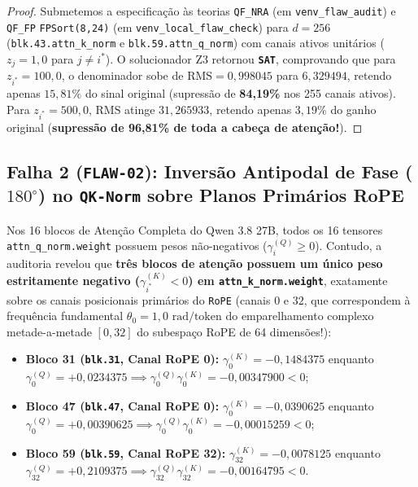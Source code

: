 \documentclass[11pt,a4paper]{article}
\theoremstyle{definition}
\begin{document}
\begin{proof}
Submetemos a especificação às teorias \texttt{QF\_NRA} (em \texttt{venv\_flaw\_audit}) e \texttt{QF\_FP} \texttt{FPSort(8,24)} (em \texttt{venv\_local\_flaw\_check}) para $d = 256$ (\texttt{blk.43.attn\_k\_norm} e \texttt{blk.59.attn\_q\_norm}) com canais ativos unitários ($z_j = 1{,}0$ para $j \neq i^*$). O solucionador Z3 retornou \textbf{\texttt{SAT}}, comprovando que para $z_{i^*} = 100{,}0$, o denominador sobe de $\text{RMS} = 0{,}998045$ para $6{,}329494$, retendo apenas $15{,}81\%$ do sinal original (supressão de \textbf{84,19\%} nos 255 canais ativos). Para $z_{i^*} = 500{,}0$, $\text{RMS}$ atinge $31{,}265933$, retendo apenas $3{,}19\%$ do ganho original (\textbf{supressão de 96,81\% de toda a cabeça de atenção!}). \qedhere
\end{proof}

\subsection{Falha 2 (\texttt{FLAW-02}): Inversão Antipodal de Fase ($180^\circ$) no \texttt{QK-Norm} sobre Planos Primários RoPE}

Nos 16 blocos de Atenção Completa do Qwen 3.8 27B, todos os 16 tensores \texttt{attn\_q\_norm.weight} possuem pesos não-negativos ($\gamma_i^{(Q)} \ge 0$). Contudo, a auditoria revelou que \textbf{três blocos de atenção possuem um único peso estritamente negativo ($\gamma_{i^*}^{(K)} < 0$) em \texttt{attn\_k\_norm.weight}}, exatamente sobre os canais posicionais primários do \texttt{RoPE} (canais $0$ e $32$, que correspondem à frequência fundamental $\theta_0 = 1{,}0\text{ rad/token}$ do emparelhamento complexo metade-a-metade $[0, 32]$ do subespaço RoPE de 64 dimensões!):
\begin{itemize}
    \item \textbf{Bloco 31 (\texttt{blk.31}, Canal RoPE 0):} $\gamma_0^{(K)} = -0{,}1484375$ enquanto $\gamma_0^{(Q)} = +0{,}0234375 \implies \gamma_0^{(Q)}\gamma_0^{(K)} = -0{,}00347900 < 0$;
    \item \textbf{Bloco 47 (\texttt{blk.47}, Canal RoPE 0):} $\gamma_0^{(K)} = -0{,}0390625$ enquanto $\gamma_0^{(Q)} = +0{,}00390625 \implies \gamma_0^{(Q)}\gamma_0^{(K)} = -0{,}00015259 < 0$;
    \item \textbf{Bloco 59 (\texttt{blk.59}, Canal RoPE 32):} $\gamma_{32}^{(K)} = -0{,}0078125$ enquanto $\gamma_{32}^{(Q)} = +0{,}2109375 \implies \gamma_{32}^{(Q)}\gamma_{32}^{(K)} = -0{,}00164795 < 0$.
\end{itemize}
\end{document}
